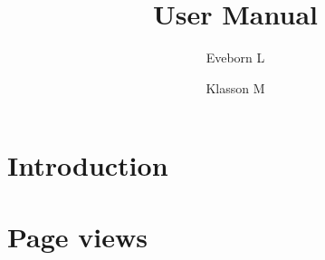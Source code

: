 \documentclass[12pt]{article}
\title{\Huge User Manual}
\author{Eveborn L
        \and Klasson M}
\begin{document}



\setlength{\parskip}{1em}
    
    \pagebreak
    \section{Introduction}
    
    \pagebreak
    
    \section{Page views}
    
    
    \pagebreak
    
\end{document}

